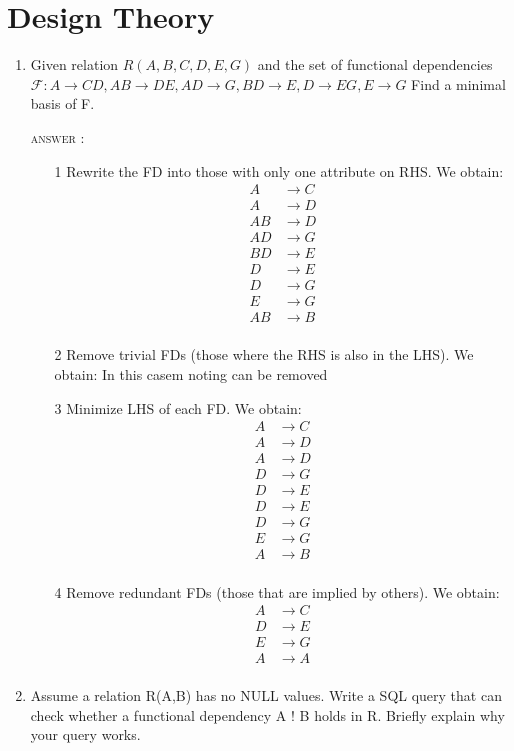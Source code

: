 \documentclass[a4paper, 11pt]{article}
\begin{document}
\section{Design Theory}
\begin{enumerate}
\item Given relation $R(A, B, C, D, E, G)$ and the set of functional dependencies $\mathcal{F}: A \rightarrow CD, AB \rightarrow DE, AD \rightarrow  G, BD \rightarrow E, D \rightarrow EG, E \rightarrow G$
Find a minimal basis of F.

\textsc{answer : }
\begin{itemize}
\item[1] Rewrite the FD into those with only one attribute on RHS. We obtain: 
\begin{align*}
A &\rightarrow C\\
A &\rightarrow D\\
AB &\rightarrow D\\
A D&\rightarrow G\\
BD &\rightarrow E\\
 D &\rightarrow E\\
 D &\rightarrow G\\
 E &\rightarrow G\\
AB &\rightarrow B\\
\end{align*}

\item[2]  Remove trivial FDs (those where the RHS is also in the LHS). We obtain: In this casem noting can be removed
\item[3] Minimize LHS of each FD. We obtain: 
 \begin{align*}
A &\rightarrow C\\
A &\rightarrow D\\
A &\rightarrow D\\
D&\rightarrow G\\
D &\rightarrow E\\
 D &\rightarrow E\\
 D &\rightarrow G\\
 E &\rightarrow G\\
A &\rightarrow B\\
\end{align*}
\item[4]  Remove redundant FDs (those that are implied by others). We obtain: 
\begin{align*}
A &\rightarrow C\\
D &\rightarrow E\\
 E &\rightarrow G\\
A &\rightarrow A\\
\end{align*}
\end{itemize} 
\item Assume a relation R(A,B) has no NULL values. Write a SQL query that can check whether a functional dependency A ! B holds in R. Briefly explain why your query works.


\end{enumerate}
\end{document}
